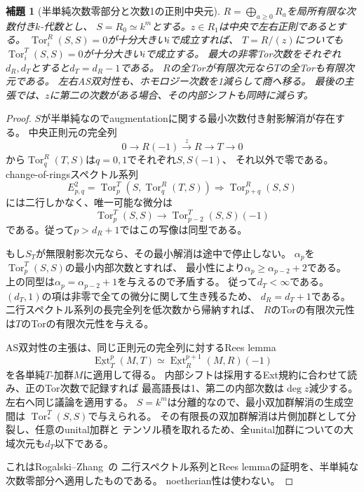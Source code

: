 \documentclass[11pt,a4paper]{ltjsarticle}
\newtheorem{lemma}[theorem]{補題}
\theoremstyle{definition}
\begin{document}
\begin{lemma}[半単純次数零部分と次数1の正則中央元]
\label{ibar:lem:semisimple-normal-quotient}
$R=\bigoplus_{a\ge0}R_a$を局所有限な次数付き$k$-代数とし、
$S=R_0\simeq k^m$とする。$z\in R_1$は中央で左右正則であるとする。
$\operatorname{Tor}^R_i(S,S)=0$が十分大きい$i$で成立すれば、
$T=R/(z)$についても$\operatorname{Tor}^T_i(S,S)=0$が十分大きい$i$で成立する。
最大の非零Tor次数をそれぞれ$d_R,d_T$とすると$d_T=d_R-1$である。
$R$の全Torが有限次元なら$T$の全Torも有限次元である。
左右AS双対性も、ホモロジー次数を1減らして商へ移る。
最後の主張では、$z$に第二の次数がある場合、その内部シフトも同時に減らす。
\end{lemma}
\begin{proof}
$S$が半単純なのでaugmentationに関する最小次数付き射影解消が存在する。
中央正則元の完全列
\[
0\longrightarrow R(-1)\xrightarrow{z}R\longrightarrow T\longrightarrow0
\]
から$\operatorname{Tor}^R_q(T,S)$は$q=0,1$でそれぞれ$S,S(-1)$、
それ以外で零である。change-of-ringsスペクトル系列
\[
E^2_{p,q}=\operatorname{Tor}^T_p
  (S,\operatorname{Tor}^R_q(T,S))
\Longrightarrow\operatorname{Tor}^R_{p+q}(S,S)
\]
には二行しかなく、唯一可能な微分は
\[
\operatorname{Tor}^T_p(S,S)
\longrightarrow\operatorname{Tor}^T_{p-2}(S,S)(-1)
\]
である。従って$p>d_R+1$ではこの写像は同型である。

もし$S_T$が無限射影次元なら、その最小解消は途中で停止しない。
$\alpha_p$を$\operatorname{Tor}^T_p(S,S)$の最小内部次数とすれば、
最小性により$\alpha_p\ge\alpha_{p-2}+2$である。
上の同型は$\alpha_p=\alpha_{p-2}+1$を与えるので矛盾する。
従って$d_T<\infty$である。
$(d_T,1)$の項は非零で全ての微分に関して生き残るため、
$d_R=d_T+1$である。二行スペクトル系列の長完全列を低次数から帰納すれば、
$R$のTorの有限次元性は$T$のTorの有限次元性を与える。

AS双対性の主張は、同じ正則元の完全列に対するRees lemma
\[
\underline{\operatorname{Ext}}^{p}_T(M,T)
\simeq\underline{\operatorname{Ext}}^{p+1}_R(M,R)(-1)
\]
を各単純$T$-加群$M$に適用して得る。
内部シフトは採用するExt規約に合わせて読み、正のTor次数で記録すれば
最高語長は1、第二の内部次数は$\deg z$減少する。
左右へ同じ議論を適用する。
$S=k^m$は分離的なので、最小双加群解消の生成空間は
$\operatorname{Tor}^T_*(S,S)$で与えられる。
その有限長の双加群解消は片側加群として分裂し、任意のunital加群と
テンソル積を取れるため、全unital加群についての大域次元も$d_T$以下である。

これはRogalski--Zhang~\cite[Lemma~1.1, Corollary~1.2]{RZ}の
二行スペクトル系列とRees lemmaの証明を、半単純な次数零部分へ適用したものである。
noetherian性は使わない。
\end{proof}
\end{document}
